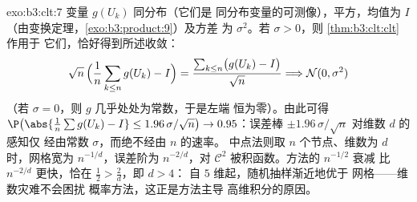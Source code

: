 \begin{solution}{exo:b3:clt:7}
变量 $g(U_k)$ 同分布（它们是
同分布变量的可测像），平方，均值为 $I$
（由变换定理，\cref{exo:b3:product:9}）及方差
为 $\sigma^2$。若 $\sigma > 0$，则 \cref{thm:b3:clt:clt} 作用于
它们，恰好得到所述收敛：
\[
\sqrt n\,\Bigl(\frac1n\sum_{k\leq n}g(U_k) - I\Bigr) =
\frac{\sum_{k\leq n}\bigl(g(U_k) - I\bigr)}{\sqrt n}
\Longrightarrow \mathcal N(0, \sigma^2)
\]
（若 $\sigma = 0$，则 $g$ 几乎处处为常数，于是左端
恒为零）。由此可得
$\P\bigl(\abs{\frac1n\sum g(U_k) - I} \leq
1.96\,\sigma/\sqrt n\bigr) \to 0.95$：误差棒 $\pm
1.96\,\sigma/\sqrt n$ 对维数 $d$ 的感知仅
经由常数 $\sigma$，而绝不经由 $n$ 的速率。
中点法则取 $n$ 个节点、维数为 $d$ 时，网格宽为
$n^{-1/d}$，误差阶为 $n^{-2/d}$，对 $\mathcal C^2$
被积函数。方法的 $n^{-1/2}$ 衰减
比 $n^{-2/d}$ 更快，恰在 $\frac12 > \frac2d$，即 $d > 4$：
自 $5$ 维起，随机抽样渐近地优于
网格——维数灾难不会困扰
概率方法，这正是方法主导
高维积分的原因。
\end{solution}


